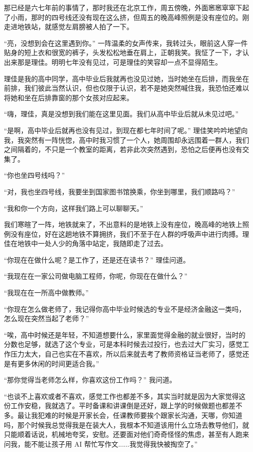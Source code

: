 那已经是六七年前的事情了，那时我还在北京工作，周五傍晚，外面窸窸窣窣下起了小雨，那时的四号线还没有现在这么挤，但周五的晚高峰照例是没有座位的。刚走进地铁站，就感觉左肩膀被人拍了一下。

“亮，没想到会在这里遇到你。” 一阵温柔的女声传来，我转过头，眼前这人穿一件贴身的短上衣和很宽的裤子，头发松松地垂在肩上，正朝我笑。我怔了一下，才认出来那是理佳。明明七年没有见过，可是理佳的笑容却一点不显得陌生。

理佳是我的高中同学，高中毕业后我就再也没见过她，当时她坐在后排，而我坐在前排，我们彼此当然认识，但也仅限于认识，若不是她突然喊住我，我恐怕还难以将她和坐在后排靠窗的那个女孩对应起来。

“嗨，理佳，真是没想到我们能在这里见面。我们从高中毕业后就从未见过吧。”

“是啊，高中毕业后就再也没有见过，到现在都七年时间了呢。” 理佳笑吟吟地望向我，我突然有一阵恍惚，高中时我习惯了一个人，她周围却永远围着一群人，我们之间隔着的，不只是一个教室的距离，若非此次突然遇到，恐怕之后便再也没有交集了。

“你也坐四号线吗？”

“对，我也坐四号线，我要坐到国家图书馆换乘，你坐到哪里，我们顺路吗？”

“我和你一个方向，这样我们路上可以聊聊天。”

我们寒暄了一阵，地铁就来了，不出意料的是地铁上没有座位，晚高峰的地铁上照例没有座位，好在这趟地铁不算拥挤，我们不至于在人群的呼吸声中进行肉搏。理佳在地铁中一处人少的角落中站定，我随即走了过去。

“你现在在做什么呢？是工作了，还是还在读书？” 理佳问道。

“我现在在一家公司做电脑工程师，你呢，你现在在做什么？”

“我现在在一所高中做教师。”

“你现在怎么做老师了，我记得你高中毕业时候选的专业不是经济金融这一类吗，怎么现在突然当起了老师？”

“唉，高中时候还是年轻，不知道想要什么，家里面觉得金融的就业很好，当时的分数也足够，就选了这个专业，可是本科时候去过投行，也去过大厂实习，感觉工作压力太大，自己也实在不喜欢，所以后来就去考了教师资格证当老师了，感觉还是有更多休闲的时间更适合我。”

“那你觉得当老师怎么样，你喜欢这份工作吗？” 我问道。

“也谈不上喜欢或者不喜欢，感觉工作也都差不多，其实当时就是因为大家觉得这份工作安稳，我就选了。平时备课和讲课倒是还好，跟上学的时候做题也都差不多。最让我犯难的时候是开家长会，任课教师要挨个跟家长沟通，天哪，你知道吗，那个时候我总觉得我是在装大人，我根本不知道该用什么立场去教导他们，就只能顺着话说，机械地夸奖，安慰。还要面对他们奇奇怪怪的焦虑，甚至有人跑来问我，能不能让孩子用 AI 帮忙写作文......我觉得我快被掏空了。”

